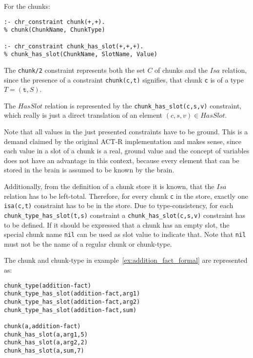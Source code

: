 For the chunks:

\begin{lstlisting}
:- chr_constraint chunk(+,+).
% chunk(ChunkName, ChunkType)

:- chr_constraint chunk_has_slot(+,+,+).
% chunk_has_slot(ChunkName, SlotName, Value)
\end{lstlisting}

The \lstinline|chunk/2| constraint represents both the set $C$ of chunks and the $Isa$ relation, since the presence of a constraint \lstinline|chunk(c,t)| signifies, that chunk \lstinline|c| is of a type $T = (\mathtt{t},S)$.

The $HasSlot$ relation is represented by the \lstinline|chunk_has_slot(c,s,v)| constraint, which really is just a direct translation of an element $(c,s,v) \in HasSlot$.

Note that all values in the just presented constraints have to be ground. This is a demand claimed by the original ACT-R implementation and makes sense, since each value in a slot of a chunk is a real, ground value and the concept of variables does not have an advantage in this context, because every element that can be stored in the brain is assumed to be known by the brain.

Additionally, from the definition of a chunk store it is known, that the $Isa$ relation has to be left-total. Therefore, for every chunk \lstinline|c| in the store, exactly one \lstinline|isa(c,t)| constraint has to be in the store. Due to type-consistency, for each \lstinline|chunk_type_has_slot(t,s)| constraint a \lstinline|chunk_has_slot(c,s,v)| constraint has to be defined. If it should be expressed that a chunk has an empty slot, the special chunk name \lstinline|nil| can be used as slot value to indicate that. Note that \lstinline|nil| must not be the name of a regular chunk or chunk-type.

\begin{example}
\label{ex:addition_fact_chr}
The chunk and chunk-type in example~\ref{ex:addition_fact_formal} are represented as:

\begin{lstlisting}
chunk_type(addition-fact)
chunk_type_has_slot(addition-fact,arg1)
chunk_type_has_slot(addition-fact,arg2)
chunk_type_has_slot(addition-fact,sum)

chunk(a,addition-fact)
chunk_has_slot(a,arg1,5)
chunk_has_slot(a,arg2,2)
chunk_has_slot(a,sum,7)
\end{lstlisting}
\end{example}


